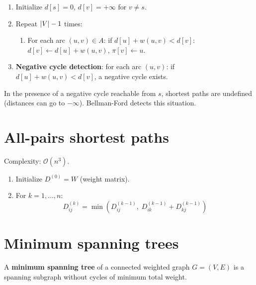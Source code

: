 \begin{algorithme}[title=\textbf{Bellman-Ford Algorithm}]
\begin{enumerate}
  \item Initialize $d[s] = 0$, $d[v] = +\infty$ for $v \ne s$.
  \item Repeat $\left| V \right| - 1$ times:
    \begin{enumerate}
      \item For each arc $(u,v) \in A$: if $d[u] + w(u,v) < d[v]$:
            $d[v] \leftarrow d[u] + w(u,v)$, $\pi[v] \leftarrow u$.
    \end{enumerate}
  \item \textbf{Negative cycle detection}: for each arc $(u,v)$:
        if $d[u] + w(u,v) < d[v]$, a negative cycle exists.
\end{enumerate}
\end{algorithme}

\begin{warning}[title=\textbf{Negative cycles}]
In the presence of a negative cycle reachable from $s$, shortest paths are
undefined (distances can go to $-\infty$). Bellman-Ford detects this situation.
\end{warning}

\section{All-pairs shortest paths}

\begin{algorithme}[title=\textbf{Floyd-Warshall Algorithm}]
Complexity: $\mathcal{O}(n^3)$.
\begin{enumerate}
  \item Initialize $D^{(0)} = W$ (weight matrix).
  \item For $k = 1, \ldots, n$:
    \[
      D^{(k)}_{ij} = \min\left(D^{(k-1)}_{ij},\;
        D^{(k-1)}_{ik} + D^{(k-1)}_{kj}\right)
    \]
\end{enumerate}
\end{algorithme}

\section{Minimum spanning trees}

\begin{definition}
A \textbf{minimum spanning tree} of a connected weighted graph $G = (V, E)$ is
a spanning subgraph without cycles of minimum total weight.
\end{definition}

